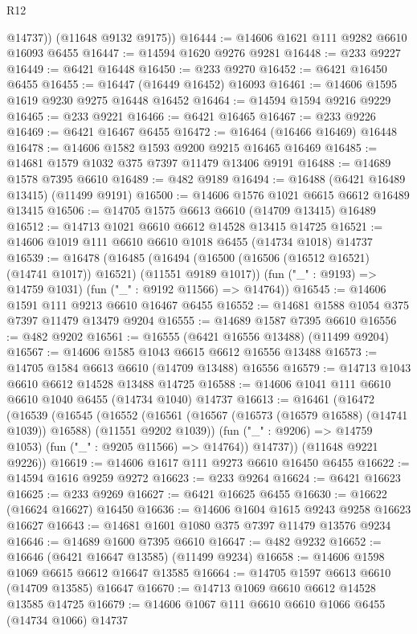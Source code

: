 \begin{lexlean}{R12}
\begin{coremodule}
{{{{{{{{{{{{{{{{{{{{{{{{{{{{{{{{{{{{{{{{{{{{{{{{{{{{{{{{{{{{{{{{{{{{{{{{{{{{{{{{{{          @14737))
      (@11648 @9132 @9175))
@16444 := @14606 @1621 @111 @9282 @6610 @16093 @6455
@16447 := @14594 @1620 @9276 @9281
@16448 := @233 @9227
@16449 := @6421 @16448
@16450 := @233 @9270
@16452 := @6421 @16450 @6455
@16455 := @16447 (@16449 @16452) @16093
@16461 := @14606 @1595 @1619 @9230 @9275 @16448 @16452
@16464 := @14594 @1594 @9216 @9229
@16465 := @233 @9221
@16466 := @6421 @16465
@16467 := @233 @9226
@16469 := @6421 @16467 @6455
@16472 := @16464 (@16466 @16469) @16448
@16478 := @14606 @1582 @1593 @9200 @9215 @16465 @16469
@16485 := @14681 @1579 @1032 @375 @7397 @11479 @13406 @9191
@16488 := @14689 @1578 @7395 @6610
@16489 := @482 @9189
@16494 := @16488 (@6421 @16489 @13415) (@11499 @9191)
@16500 := @14606 @1576 @1021 @6615 @6612 @16489 @13415
@16506 := @14705 @1575 @6613 @6610 (@14709 @13415) @16489
@16512 := @14713 @1021 @6610 @6612 @14528 @13415 @14725
@16521 := @14606 @1019 @111 @6610 @6610 @1018 @6455 (@14734 @1018) @14737
@16539 := @16478
    (@16485
      (@16494 (@16500 (@16506 (@16512 @16521) (@14741 @1017)) @16521) (@11551 @9189 @1017))
      (fun ("_" : @9193) => @14759 @1031)
      (fun ("_" : @9192 @11566) => @14764))
@16545 := @14606 @1591 @111 @9213 @6610 @16467 @6455
@16552 := @14681 @1588 @1054 @375 @7397 @11479 @13479 @9204
@16555 := @14689 @1587 @7395 @6610
@16556 := @482 @9202
@16561 := @16555 (@6421 @16556 @13488) (@11499 @9204)
@16567 := @14606 @1585 @1043 @6615 @6612 @16556 @13488
@16573 := @14705 @1584 @6613 @6610 (@14709 @13488) @16556
@16579 := @14713 @1043 @6610 @6612 @14528 @13488 @14725
@16588 := @14606 @1041 @111 @6610 @6610 @1040 @6455 (@14734 @1040) @14737
@16613 := @16461
    (@16472
      (@16539
        (@16545
          (@16552
            (@16561 (@16567 (@16573 (@16579 @16588) (@14741 @1039)) @16588) (@11551 @9202 @1039))
            (fun ("_" : @9206) => @14759 @1053)
            (fun ("_" : @9205 @11566) => @14764))
          @14737))
      (@11648 @9221 @9226))
@16619 := @14606 @1617 @111 @9273 @6610 @16450 @6455
@16622 := @14594 @1616 @9259 @9272
@16623 := @233 @9264
@16624 := @6421 @16623
@16625 := @233 @9269
@16627 := @6421 @16625 @6455
@16630 := @16622 (@16624 @16627) @16450
@16636 := @14606 @1604 @1615 @9243 @9258 @16623 @16627
@16643 := @14681 @1601 @1080 @375 @7397 @11479 @13576 @9234
@16646 := @14689 @1600 @7395 @6610
@16647 := @482 @9232
@16652 := @16646 (@6421 @16647 @13585) (@11499 @9234)
@16658 := @14606 @1598 @1069 @6615 @6612 @16647 @13585
@16664 := @14705 @1597 @6613 @6610 (@14709 @13585) @16647
@16670 := @14713 @1069 @6610 @6612 @14528 @13585 @14725
@16679 := @14606 @1067 @111 @6610 @6610 @1066 @6455 (@14734 @1066) @14737
}}}}}}}}}}}}}}}}}}}}}}}}}}}}}}}}}}}}}}}}}}}}}}}}}}}}}}}}}}}}}}}}}}}}}}}}}}}}}}}}}}
\end{coremodule}
\end{lexlean}
